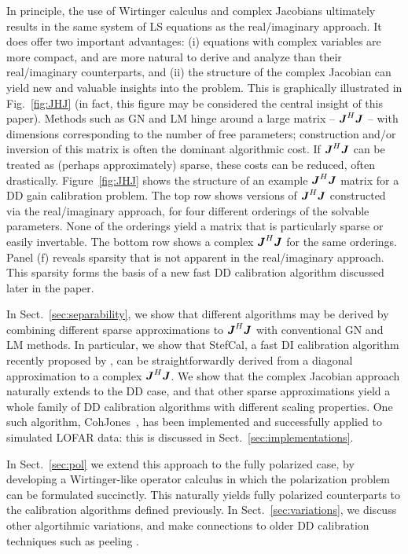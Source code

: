 \documentclass[useAMS,usenatbib]{mn2e}
\newcommand{\mat}[1]{{\bmath{#1}}}
\newcommand{\JJ}{\mat{J}} %
\newcommand{\JHJ}{\JJ^H\JJ} %
\newcommand{\COH}{{\sc CohJones}}
\newcommand{\StefCal}{{\sc StefCal}}
\begin{document}
In principle, the use of Wirtinger calculus and complex Jacobians ultimately results in the same system of LS 
equations as the real/imaginary approach. It does offer two important advantages: (i) equations with complex variables 
are more compact, and are more natural to derive and analyze than their real/imaginary counterparts, and (ii) the structure of the
complex Jacobian can yield new and valuable insights into the problem. This is graphically illustrated in 
Fig.~\ref{fig:JHJ} (in fact, this figure may be considered the central insight of this paper). Methods such as 
GN and LM hinge around a large matrix -- $\JHJ$ -- with dimensions corresponding to the number of 
free parameters; construction and/or inversion of this matrix is often the dominant algorithmic cost. If $\JHJ$ can
be treated as (perhaps approximately) sparse, these costs can be reduced, often drastically. Figure~\ref{fig:JHJ} 
shows the structure of an example $\JHJ$ matrix for a DD gain calibration problem. The top row shows versions of
$\JHJ$ constructed via the real/imaginary approach, for four different orderings of the solvable parameters. None of
the orderings yield a matrix that is particularly sparse or easily invertable. The bottom row shows a 
complex $\JHJ$ for the same orderings. Panel (f) reveals sparsity that is not apparent in the real/imaginary 
approach. This sparsity forms the basis of a new fast DD calibration algorithm discussed later in the paper.

In Sect.~\ref{sec:separability}, we show that different algorithms may be derived by combining 
different sparse approximations to $\JHJ$ with conventional GN and LM methods.  In particular, we show 
that \StefCal, a fast DI calibration algorithm recently proposed by \citet{Stefcal},
can be straightforwardly derived from a diagonal approximation to a complex $\JHJ$. We show that the 
complex Jacobian approach naturally extends to the DD case, and that other sparse approximations yield a whole family
of DD calibration algorithms with different scaling properties. One such algorithm, \COH\ \citep{Tasse-cohjones}, has been implemented 
and successfully applied to simulated LOFAR data: this is discussed in Sect.~\ref{sec:implementations}.

In Sect.~\ref{sec:pol} we extend this approach to the fully polarized case, by developing a Wirtinger-like 
operator calculus in which the polarization problem can be formulated succinctly. This naturally yields 
fully polarized counterparts to the calibration algorithms defined previously. In Sect.~\ref{sec:variations}, 
we discuss other algortihmic variations, and make connections to older DD calibration techniques such as 
peeling \citep{JEN:peeling}. 
\end{document}
